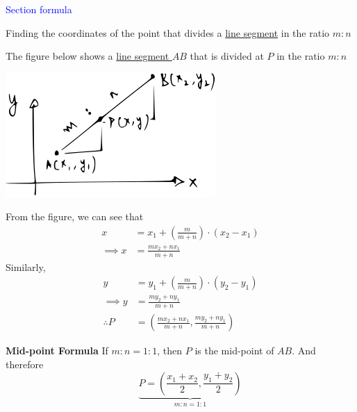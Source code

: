 \documentclass[14pt,fleqn]{extarticle}
\begin{document}
 
\begin{skill}
    \begin{narrow}
         \textcolor{blue}{Section formula}
         
         Finding the coordinates of the point that divides a \underline{line segment} 
         in the ratio $m:n$
    \end{narrow}
    
    \reason 
    
    The figure below shows a \underline{line segment $AB$} that is divided at $P$ in the ratio $m:n$ \newline 
    
    \begin{center}
\includegraphics[scale=1.65]{136-A.svg}
\end{center}
    
    From the figure, we can see that 
    \begin{align}
	x &= x_1 + \left(\frac{m}{m+n} \right)\cdot \left(x_2 - x_1 \right) \\
	\implies x &= \frac{mx_2 + nx_1}{m+n}
\end{align}
Similarly, 
\begin{align}
	y &= y_1 + \left(\frac{m}{m+n} \right)\cdot \left(y_2 - y_1 \right) \\
	\implies y &= \frac{my_2 + ny_1}{m+n} \\
	\therefore P &= \left(\frac{mx_2 + nx_1}{m+n}, \frac{my_2 + ny_1}{m+n} \right)
\end{align}

\textbf{Mid-point Formula} \newline 
If $m:n = 1:1$, then $P$ is the mid-point of $AB$. And therefore 
\[ \qquad \underbrace{P = \left(\frac{x_1 + x_2}{2}, \frac{y_1+y_2}{2} \right)}_{m : n = 1:1}\]
    
\end{skill}
\end{document}
